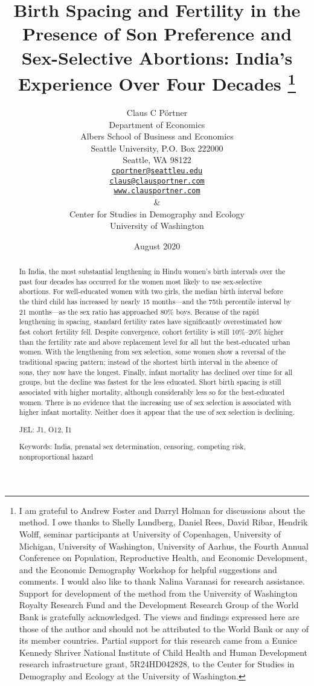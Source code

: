 \documentclass[12pt,letterpaper]{article}
\title{Birth Spacing and Fertility in the Presence of Son Preference and Sex-Selective Abortions:
India's Experience Over Four Decades%
\protect\thanks{%
I am grateful to Andrew Foster and Darryl Holman for discussions about the method.
I owe thanks to Shelly Lundberg, Daniel Rees, David Ribar, 
Hendrik Wolff, seminar participants at University of Copenhagen, University of Michigan, 
University of Washington, University of Aarhus, the Fourth 
Annual Conference on Population, Reproductive Health, 
and Economic Development, and the Economic Demography Workshop for helpful 
suggestions and comments.
I would also like to thank Nalina Varanasi for research assistance.
Support for development of the method from the University of Washington Royalty 
Research Fund and the Development Research Group of the World Bank is gratefully 
acknowledged.
The views and findings expressed here are those of the author and
should not be attributed to the World Bank or any of its member countries.
Partial support for this research came from a Eunice Kennedy Shriver National
Institute of Child Health and Human Development research infrastructure grant,
5R24HD042828, to the Center for Studies in Demography and Ecology at the
University of Washington.
}
}
\author{Claus C P\"ortner\\
    Department of Economics\\
    Albers School of Business and Economics\\
    Seattle University, P.O. Box 222000\\
    Seattle, WA 98122\\
    \href{mailto:cportner@seattleu.edu}{\texttt{cportner@seattleu.edu}}\\
    \href{mailto:claus@clausportner.com}{\texttt{claus@clausportner.com}}\\
    \href{http://www.clausportner.com}{\texttt{www.clausportner.com}}\\
    \& \\
    Center for Studies in Demography and Ecology \\
    University of Washington\\ \vspace{2cm}
    }
\date{August 2020}
\begin{document}
\graphicspath{{../figures/}}

\setcounter{page}{-1}
\maketitle
\thispagestyle{empty}



\newpage
\thispagestyle{empty}
\doublespacing

\begin{abstract}

\noindent 
In India, the most substantial lengthening in Hindu women's birth intervals over the past 
four decades has occurred for the women most likely to use sex-selective abortions. 
For well-educated women with two girls, the median birth interval before the third child 
has increased by nearly 15 months---and the 75th percentile interval by 21 months---as the 
sex ratio has approached 80\% boys. 
Because of the rapid lengthening in spacing, standard fertility rates have significantly 
overestimated how fast cohort fertility fell. 
Despite convergence, cohort fertility is still 10\%--20\% higher than the 
fertility rate and above replacement level for all but the best-educated urban women. 
With the lengthening from sex selection, some women show a reversal of the traditional 
spacing pattern; instead of the shortest birth interval in the absence of sons, they now 
have the longest. 
Finally, infant mortality has declined over time for all groups, but the decline was 
fastest for the less educated. 
Short birth spacing is still associated with higher mortality, although considerably less 
so for the best-educated women. 
There is no evidence that the increasing use of sex selection is associated with higher 
infant mortality. 
Neither does it appear that the use of sex selection is declining.



\noindent JEL: J1, O12, I1

\noindent Keywords: India, prenatal sex determination, censoring, competing risk, 
nonproportional hazard
\end{abstract}
\end{document}
